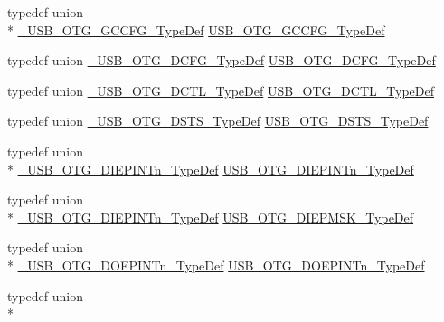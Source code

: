 \begin{DoxyCompactItemize}
\item 
typedef union \\*
\hyperlink{union___u_s_b___o_t_g___g_c_c_f_g___type_def}{\-\_\-\-U\-S\-B\-\_\-\-O\-T\-G\-\_\-\-G\-C\-C\-F\-G\-\_\-\-Type\-Def} \hyperlink{group______otg___core__registers_ga43a6dd16b2d79faf59f486969b563fec}{U\-S\-B\-\_\-\-O\-T\-G\-\_\-\-G\-C\-C\-F\-G\-\_\-\-Type\-Def}
\item 
typedef union \hyperlink{union___u_s_b___o_t_g___d_c_f_g___type_def}{\-\_\-\-U\-S\-B\-\_\-\-O\-T\-G\-\_\-\-D\-C\-F\-G\-\_\-\-Type\-Def} \hyperlink{group______otg___core__registers_ga7713d6d8bc4ef35f2655e05f59aacbfd}{U\-S\-B\-\_\-\-O\-T\-G\-\_\-\-D\-C\-F\-G\-\_\-\-Type\-Def}
\item 
typedef union \hyperlink{union___u_s_b___o_t_g___d_c_t_l___type_def}{\-\_\-\-U\-S\-B\-\_\-\-O\-T\-G\-\_\-\-D\-C\-T\-L\-\_\-\-Type\-Def} \hyperlink{group______otg___core__registers_ga6aab28e2f9b33185c7de34376313c69c}{U\-S\-B\-\_\-\-O\-T\-G\-\_\-\-D\-C\-T\-L\-\_\-\-Type\-Def}
\item 
typedef union \hyperlink{union___u_s_b___o_t_g___d_s_t_s___type_def}{\-\_\-\-U\-S\-B\-\_\-\-O\-T\-G\-\_\-\-D\-S\-T\-S\-\_\-\-Type\-Def} \hyperlink{group______otg___core__registers_ga0e588bde710d16acddf3539e846abdd4}{U\-S\-B\-\_\-\-O\-T\-G\-\_\-\-D\-S\-T\-S\-\_\-\-Type\-Def}
\item 
typedef union \\*
\hyperlink{union___u_s_b___o_t_g___d_i_e_p_i_n_tn___type_def}{\-\_\-\-U\-S\-B\-\_\-\-O\-T\-G\-\_\-\-D\-I\-E\-P\-I\-N\-Tn\-\_\-\-Type\-Def} \hyperlink{group______otg___core__registers_ga005babc9aeee0af8bd5ca77d804fec78}{U\-S\-B\-\_\-\-O\-T\-G\-\_\-\-D\-I\-E\-P\-I\-N\-Tn\-\_\-\-Type\-Def}
\item 
typedef union \\*
\hyperlink{union___u_s_b___o_t_g___d_i_e_p_i_n_tn___type_def}{\-\_\-\-U\-S\-B\-\_\-\-O\-T\-G\-\_\-\-D\-I\-E\-P\-I\-N\-Tn\-\_\-\-Type\-Def} \hyperlink{group______otg___core__registers_ga04afd2bae3c080f436e1d6026a1e7aa1}{U\-S\-B\-\_\-\-O\-T\-G\-\_\-\-D\-I\-E\-P\-M\-S\-K\-\_\-\-Type\-Def}
\item 
typedef union \\*
\hyperlink{union___u_s_b___o_t_g___d_o_e_p_i_n_tn___type_def}{\-\_\-\-U\-S\-B\-\_\-\-O\-T\-G\-\_\-\-D\-O\-E\-P\-I\-N\-Tn\-\_\-\-Type\-Def} \hyperlink{group______otg___core__registers_gae4834079779b32ae4b7cc8cbe07c116a}{U\-S\-B\-\_\-\-O\-T\-G\-\_\-\-D\-O\-E\-P\-I\-N\-Tn\-\_\-\-Type\-Def}
\item 
typedef union \\*

\end{DoxyCompactItemize}
